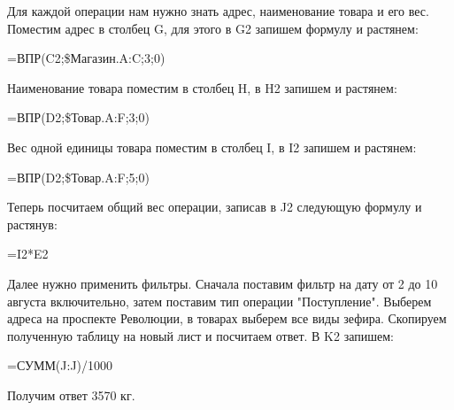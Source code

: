 \documentclass[14pt,a4paper]{article}
\begin{document}
Для каждой операции нам нужно знать адрес, наименование товара и его вес.
Поместим адрес в столбец G, для этого в G2 запишем формулу и растянем:
\begin{center}
    =ВПР(C2;\$Магазин.A:C;3;0)
\end{center}
Наименование товара поместим в столбец H, в H2 запишем и растянем:
\begin{center}
    =ВПР(D2;\$Товар.A:F;3;0)
\end{center}
Вес одной единицы товара поместим в столбец I, в I2 запишем и растянем:
\begin{center}
    =ВПР(D2;\$Товар.A:F;5;0)
\end{center}
Теперь посчитаем общий вес операции, записав в J2 следующую формулу и растянув:
\begin{center}
    =I2*E2
\end{center}

Далее нужно применить фильтры. Сначала поставим фильтр на дату от 2 до 10 августа включительно, затем поставим тип операции "Поступление". Выберем адреса на проспекте Революции, в товарах выберем все виды зефира. Скопируем полученную таблицу на новый лист и посчитаем ответ. В K2 запишем:
\begin{center}
    =СУММ(J:J)/1000
\end{center}
Получим ответ 3570 кг.
\end{document}
